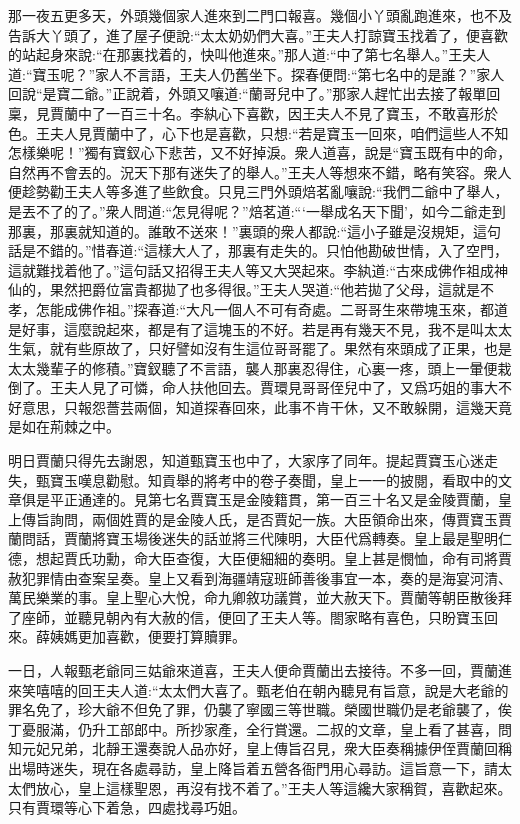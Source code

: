 \begin{parag}
    那一夜五更多天，外頭幾個家人進來到二門口報喜。幾個小丫頭亂跑進來，也不及告訴大丫頭了，進了屋子便說:“太太奶奶們大喜。”王夫人打諒寶玉找着了，便喜歡的站起身來說:“在那裏找着的，快叫他進來。”那人道:“中了第七名舉人。”王夫人道:“寶玉呢？”家人不言語，王夫人仍舊坐下。探春便問:“第七名中的是誰？”家人回說“是寶二爺。”正說着，外頭又嚷道:“蘭哥兒中了。”那家人趕忙出去接了報單回稟，見賈蘭中了一百三十名。李紈心下喜歡，因王夫人不見了寶玉，不敢喜形於色。王夫人見賈蘭中了，心下也是喜歡，只想:“若是寶玉一回來，咱們這些人不知怎樣樂呢！”獨有寶釵心下悲苦，又不好掉淚。衆人道喜，說是“寶玉既有中的命，自然再不會丟的。況天下那有迷失了的舉人。”王夫人等想來不錯，略有笑容。衆人便趁勢勸王夫人等多進了些飲食。只見三門外頭焙茗亂嚷說:“我們二爺中了舉人，是丟不了的了。”衆人問道:“怎見得呢？”焙茗道:“‘一舉成名天下聞’，如今二爺走到那裏，那裏就知道的。誰敢不送來！”裏頭的衆人都說:“這小子雖是沒規矩，這句話是不錯的。”惜春道:“這樣大人了，那裏有走失的。只怕他勘破世情，入了空門，這就難找着他了。”這句話又招得王夫人等又大哭起來。李紈道:“古來成佛作祖成神仙的，果然把爵位富貴都拋了也多得很。”王夫人哭道:“他若拋了父母，這就是不孝，怎能成佛作祖。”探春道:“大凡一個人不可有奇處。二哥哥生來帶塊玉來，都道是好事，這麼說起來，都是有了這塊玉的不好。若是再有幾天不見，我不是叫太太生氣，就有些原故了，只好譬如沒有生這位哥哥罷了。果然有來頭成了正果，也是太太幾輩子的修積。”寶釵聽了不言語，襲人那裏忍得住，心裏一疼，頭上一暈便栽倒了。王夫人見了可憐，命人扶他回去。賈環見哥哥侄兒中了，又爲巧姐的事大不好意思，只報怨薔芸兩個，知道探春回來，此事不肯干休，又不敢躲開，這幾天竟是如在荊棘之中。
\end{parag}


\begin{parag}
    明日賈蘭只得先去謝恩，知道甄寶玉也中了，大家序了同年。提起賈寶玉心迷走失，甄寶玉嘆息勸慰。知貢舉的將考中的卷子奏聞，皇上一一的披閱，看取中的文章俱是平正通達的。見第七名賈寶玉是金陵籍貫，第一百三十名又是金陵賈蘭，皇上傳旨詢問，兩個姓賈的是金陵人氏，是否賈妃一族。大臣領命出來，傳賈寶玉賈蘭問話，賈蘭將寶玉場後迷失的話並將三代陳明，大臣代爲轉奏。皇上最是聖明仁德，想起賈氏功勳，命大臣查復，大臣便細細的奏明。皇上甚是憫恤，命有司將賈赦犯罪情由查案呈奏。皇上又看到海疆靖寇班師善後事宜一本，奏的是海宴河清、萬民樂業的事。皇上聖心大悅，命九卿敘功議賞，並大赦天下。賈蘭等朝臣散後拜了座師，並聽見朝內有大赦的信，便回了王夫人等。閤家略有喜色，只盼寶玉回來。薛姨媽更加喜歡，便要打算贖罪。
\end{parag}


\begin{parag}
    一日，人報甄老爺同三姑爺來道喜，王夫人便命賈蘭出去接待。不多一回，賈蘭進來笑嘻嘻的回王夫人道:“太太們大喜了。甄老伯在朝內聽見有旨意，說是大老爺的罪名免了，珍大爺不但免了罪，仍襲了寧國三等世職。榮國世職仍是老爺襲了，俟丁憂服滿，仍升工部郎中。所抄家產，全行賞還。二叔的文章，皇上看了甚喜，問知元妃兄弟，北靜王還奏說人品亦好，皇上傳旨召見，衆大臣奏稱據伊侄賈蘭回稱出場時迷失，現在各處尋訪，皇上降旨着五營各衙門用心尋訪。這旨意一下，請太太們放心，皇上這樣聖恩，再沒有找不着了。”王夫人等這纔大家稱賀，喜歡起來。只有賈環等心下着急，四處找尋巧姐。
\end{parag}


